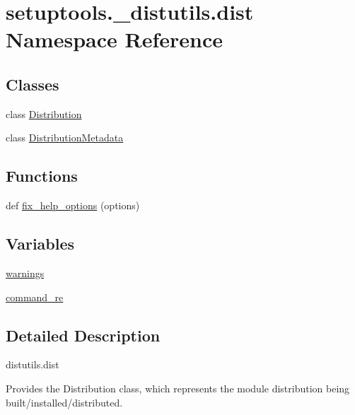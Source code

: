 \hypertarget{namespacesetuptools_1_1__distutils_1_1dist}{}\section{setuptools.\+\_\+distutils.\+dist Namespace Reference}
\label{namespacesetuptools_1_1__distutils_1_1dist}
\subsection*{Classes}
\begin{DoxyCompactItemize}
\item 
class \hyperlink{classsetuptools_1_1__distutils_1_1dist_1_1Distribution}{Distribution}
\item 
class \hyperlink{classsetuptools_1_1__distutils_1_1dist_1_1DistributionMetadata}{Distribution\+Metadata}
\end{DoxyCompactItemize}
\subsection*{Functions}
\begin{DoxyCompactItemize}
\item 
def \hyperlink{namespacesetuptools_1_1__distutils_1_1dist_aac03d5fa2fda762bb3050fec2a77f3f6}{fix\+\_\+help\+\_\+options} (options)
\end{DoxyCompactItemize}
\subsection*{Variables}
\begin{DoxyCompactItemize}
\item 
\hyperlink{namespacesetuptools_1_1__distutils_1_1dist_a80ab96d87eb447f5b2983deb6c7183df}{warnings}
\item 
\hyperlink{namespacesetuptools_1_1__distutils_1_1dist_a754cb98fc1a35421e5ef000df59a7ae7}{command\+\_\+re}
\end{DoxyCompactItemize}


\subsection{Detailed Description}
\begin{DoxyVerb}distutils.dist

Provides the Distribution class, which represents the module distribution
being built/installed/distributed.
\end{DoxyVerb}
 

